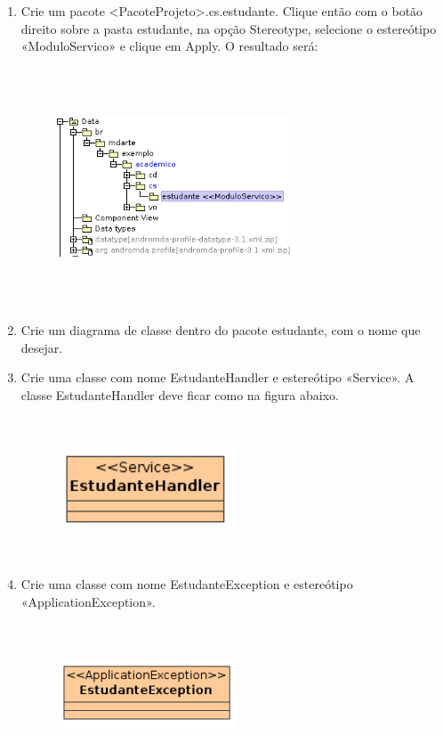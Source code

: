 \begin{enumerate}
\item Crie um pacote <PacoteProjeto>.cs.estudante. Clique então com o botão
direito sobre a pasta estudante, na opção Stereotype, selecione o estereótipo
 «ModuloServico» e clique em Apply. O resultado será:
 \begin{figure}[!htb]
	\centering
	\includegraphics[width=200pt,height=200pt]{imgs/tutorial-mdarte-0008.png}
\end{figure} 
	
\item Crie um diagrama de classe dentro do pacote estudante, com o nome que desejar.
	
\item Crie uma classe com nome EstudanteHandler e estereótipo «Service». A classe EstudanteHandler deve ficar como na figura abaixo.
\begin{figure}[!htb]
	\centering
	\includegraphics[width=150pt,height=120pt]{imgs/tutorial-mdarte-0009.png}
\end{figure} 
	
\item Crie uma classe com nome EstudanteException e estereótipo «ApplicationException».
\begin{figure}[!htb]
	\centering
	\includegraphics[width=150pt,height=120pt]{imgs/tutorial-mdarte-0010.png}
\end{figure}
	

\end{enumerate}
